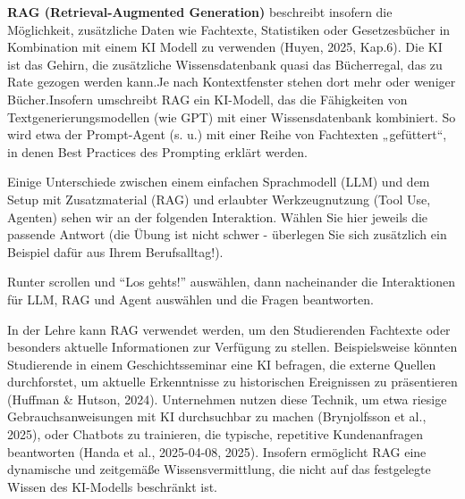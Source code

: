 \documentclass[
  ngerman,
  letterpaper,
  DIV=11]{scrreprt}
\begin{document}
\textbf{RAG (Retrieval-Augmented Generation)} beschreibt insofern die
Möglichkeit, zusätzliche Daten wie Fachtexte, Statistiken oder
Gesetzesbücher in Kombination mit einem KI Modell zu verwenden (Huyen,
2025, Kap.6). Die KI ist das Gehirn, die zusätzliche Wissensdatenbank
quasi das Bücherregal, das zu Rate gezogen werden kann.Je nach
Kontextfenster stehen dort mehr oder weniger Bücher.Insofern umschreibt
RAG ein KI-Modell, das die Fähigkeiten von Textgenerierungsmodellen (wie
GPT) mit einer Wissensdatenbank kombiniert. So wird etwa der
Prompt-Agent (s. u.) mit einer Reihe von Fachtexten „gefüttert``, in
denen Best Practices des Prompting erklärt werden.

Einige Unterschiede zwischen einem einfachen Sprachmodell (LLM) und dem
Setup mit Zusatzmaterial (RAG) und erlaubter Werkzeugnutzung (Tool Use,
Agenten) sehen wir an der folgenden Interaktion. Wählen Sie hier jeweils
die passende Antwort (die Übung ist nicht schwer - überlegen Sie sich
zusätzlich ein Beispiel dafür aus Ihrem Berufsalltag!).

\begin{tcolorbox}[enhanced jigsaw, left=2mm, bottomrule=.15mm, arc=.35mm, rightrule=.15mm, colframe=quarto-callout-tip-color-frame, coltitle=black, colback=white, toprule=.15mm, toptitle=1mm, colbacktitle=quarto-callout-tip-color!10!white, title=\textcolor{quarto-callout-tip-color}{\faLightbulb}\hspace{0.5em}{Lernspiel: LLM, RAG oder Agent, was sind mögliche Probleme und
Anwendungsfelder?}, opacitybacktitle=0.6, leftrule=.75mm, bottomtitle=1mm, titlerule=0mm, opacityback=0, breakable]

Runter scrollen und ``Los gehts!'' auswählen, dann nacheinander die
Interaktionen für LLM, RAG und Agent auswählen und die Fragen
beantworten.

\end{tcolorbox}

In der Lehre kann RAG verwendet werden, um den Studierenden Fachtexte
oder besonders aktuelle Informationen zur Verfügung zu stellen.
Beispielsweise könnten Studierende in einem Geschichtsseminar eine KI
befragen, die externe Quellen durchforstet, um aktuelle Erkenntnisse zu
historischen Ereignissen zu präsentieren (Huffman \& Hutson, 2024).
Unternehmen nutzen diese Technik, um etwa riesige Gebrauchsanweisungen
mit KI durchsuchbar zu machen (Brynjolfsson et al., 2025), oder Chatbots
zu trainieren, die typische, repetitive Kundenanfragen beantworten
(Handa et al., 2025-04-08, 2025). Insofern ermöglicht RAG eine
dynamische und zeitgemäße Wissensvermittlung, die nicht auf das
festgelegte Wissen des KI-Modells beschränkt ist.
\end{document}
